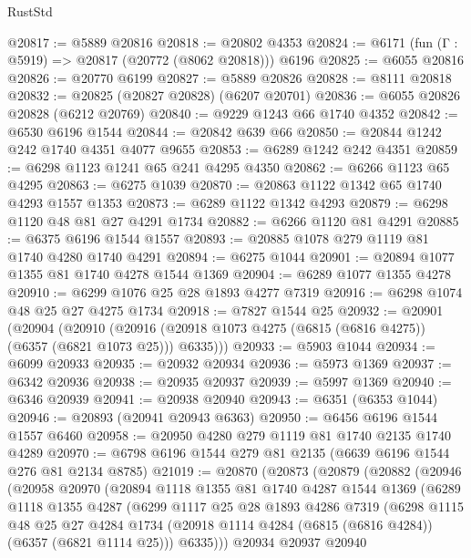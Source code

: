\begin{lexlean}{RustStd}
\begin{coremodule}
@20817 := @5889 @20816
@20818 := @20802 @4353
@20824 := @6171 (fun (Γ : @5919) => @20817 (@20772 (@8062 @20818))) @6196
@20825 := @6055 @20816
@20826 := @20770 @6199
@20827 := @5889 @20826
@20828 := @8111 @20818
@20832 := @20825 (@20827 @20828) (@6207 @20701)
@20836 := @6055 @20826 @20828 (@6212 @20769)
@20840 := @9229 @1243 @66 @1740 @4352
@20842 := @6530 @6196 @1544
@20844 := @20842 @639 @66
@20850 := @20844 @1242 @242 @1740 @4351 @4077 @9655
@20853 := @6289 @1242 @242 @4351
@20859 := @6298 @1123 @1241 @65 @241 @4295 @4350
@20862 := @6266 @1123 @65 @4295
@20863 := @6275 @1039
@20870 := @20863 @1122 @1342 @65 @1740 @4293 @1557 @1353
@20873 := @6289 @1122 @1342 @4293
@20879 := @6298 @1120 @48 @81 @27 @4291 @1734
@20882 := @6266 @1120 @81 @4291
@20885 := @6375 @6196 @1544 @1557
@20893 := @20885 @1078 @279 @1119 @81 @1740 @4280 @1740 @4291
@20894 := @6275 @1044
@20901 := @20894 @1077 @1355 @81 @1740 @4278 @1544 @1369
@20904 := @6289 @1077 @1355 @4278
@20910 := @6299 @1076 @25 @28 @1893 @4277 @7319
@20916 := @6298 @1074 @48 @25 @27 @4275 @1734
@20918 := @7827 @1544 @25
@20932 := @20901
    (@20904
      (@20910 (@20916 (@20918 @1073 @4275 (@6815 (@6816 @4275)) (@6357 (@6821 @1073 @25))) @6335)))
@20933 := @5903 @1044
@20934 := @6099 @20933
@20935 := @20932 @20934
@20936 := @5973 @1369
@20937 := @6342 @20936
@20938 := @20935 @20937
@20939 := @5997 @1369
@20940 := @6346 @20939
@20941 := @20938 @20940
@20943 := @6351 (@6353 @1044)
@20946 := @20893 (@20941 @20943 @6363)
@20950 := @6456 @6196 @1544 @1557 @6460
@20958 := @20950 @4280 @279 @1119 @81 @1740 @2135 @1740 @4289
@20970 := @6798 @6196 @1544 @279 @81 @2135 (@6639 @6196 @1544 @276 @81 @2134 @8785)
@21019 := @20870
    (@20873
      (@20879
        (@20882
          (@20946
            (@20958
              @20970
              (@20894
                @1118
                @1355
                @81
                @1740
                @4287
                @1544
                @1369
                (@6289
                  @1118
                  @1355
                  @4287
                  (@6299
                    @1117
                    @25
                    @28
                    @1893
                    @4286
                    @7319
                    (@6298
                      @1115
                      @48
                      @25
                      @27
                      @4284
                      @1734
                      (@20918 @1114 @4284 (@6815 (@6816 @4284)) (@6357 (@6821 @1114 @25)))
                      @6335)))
                @20934
                @20937
                @20940

\end{coremodule}
\end{lexlean}
